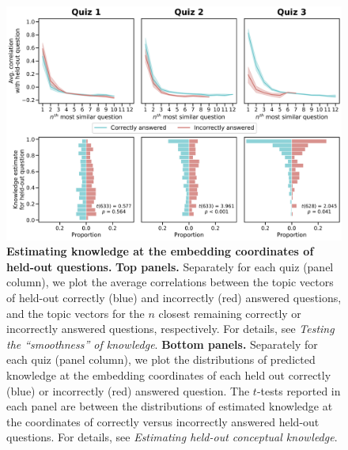\documentclass[10pt]{article}
\begin{document}
\begin{figure}[tp]
    \centering
    \includegraphics[width=\textwidth]{figs/held-out-question-analyses}
    
    \caption{\textbf{Estimating knowledge at the embedding coordinates of
    held-out questions.} \textbf{Top panels.} Separately for each quiz (panel
    column), we plot the average correlations between the topic vectors of
    held-out correctly (blue) and incorrectly (red) answered questions, and the
    topic vectors for the $n$ closest remaining correctly or incorrectly
    answered questions, respectively. For details, see \textit{Testing the
    ``smoothness'' of knowledge}. \textbf{Bottom panels.} Separately for each
    quiz (panel column), we plot the distributions of predicted knowledge at
    the embedding coordinates of each held out correctly (blue) or incorrectly
    (red) answered question. The $t$-tests reported in each panel are between
    the distributions of estimated knowledge at the coordinates of correctly
    versus incorrectly answered held-out questions. For details, see
    \textit{Estimating held-out conceptual knowledge}.}
    
    \label{fig:predictions}
\end{figure}
\end{document}
